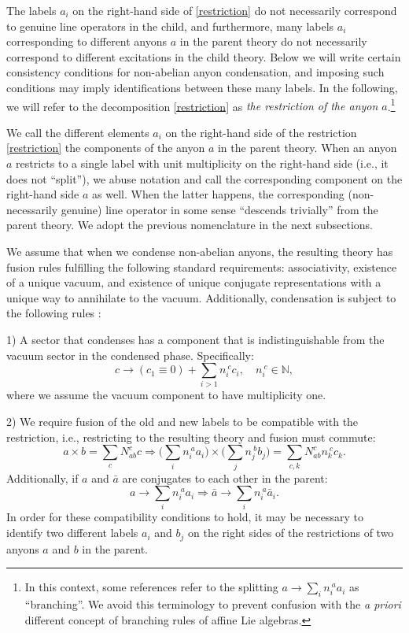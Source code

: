 \documentclass[11pt]{article}
\numberwithin{equation}{section}
\begin{document}
The labels $a_{i}$ on the right-hand side of \eqref{restriction} do not necessarily correspond to genuine line operators in the child, and furthermore, many labels $a_{i}$ corresponding to different anyons $a$ in the parent theory do not necessarily correspond to different excitations in the child theory. Below we will write certain consistency conditions for non-abelian anyon condensation, and imposing such conditions may imply identifications between these many labels. In the following, we will refer to the decomposition \eqref{restriction} as \textit{the restriction of the anyon $a$}.\footnote{In this context, some references refer to the splitting $a \to \sum_{i} n_{i}^{\ a} a_{i}$ as ``branching''. We avoid this terminology to prevent confusion with the \textit{a priori} different concept of branching rules of affine Lie algebras.} 

We call the different elements $a_{i}$ on the right-hand side of the restriction \eqref{restriction} the components of the anyon $a$ in the parent theory. When an anyon $a$ restricts to a single label with unit multiplicity on the right-hand side (i.e., it does not ``split''), we abuse notation and call the corresponding component on the right-hand side $a$ as well. When the latter happens, the corresponding (non-necessarily genuine) line operator in some sense ``descends trivially'' from the parent theory. We adopt the previous nomenclature in the next subsections.

We assume that when we condense non-abelian anyons, the resulting theory has fusion rules fulfilling the following standard requirements: associativity, existence of a unique vacuum, and existence of unique conjugate representations with a unique way to annihilate to the vacuum.  Additionally, condensation is subject to the following rules \cite{Bais:2008ni}: 

1) A sector that condenses has a component that is indistinguishable from the vacuum sector in the condensed phase. Specifically:
\begin{equation}
    c \longrightarrow (c_{1} \equiv 0) + \sum_{i>1}n_{i}^{\ c}c_{i}, \quad n_{i}^{\ c} \in \mathbb{N},
\end{equation}
where we assume the vacuum component to have multiplicity one. 

2) We require fusion of the old and new labels to be compatible with the restriction, i.e., restricting to the resulting theory and fusion must commute:
\begin{equation}
    a \times b = \sum_{c} N_{ab}^{c} c \Longrightarrow \Big( \sum_{i}n_{i}^{\ a}a_{i} \Big) \times \Big( \sum_{j}n_{j}^{\ b}b_{j} \Big) = \sum_{c,k}N_{ab}^{c}n_{k}^{\ c}c_{k}.
\end{equation}
Additionally, if $a$ and $\bar{a}$ are conjugates to each other in the parent:
\begin{equation}
    a \longrightarrow \sum_{i} n_{i}^{\ a}a_{i} \Longrightarrow \bar{a} \longrightarrow \sum_{i}n_{i}^{\ a}\bar{a}_{i}.
\end{equation}
In order for these compatibility conditions to hold, it may be necessary to identify two different labels $a_{i}$ and $b_{j}$ on the right sides of the restrictions of two anyons $a$ and $b$ in the parent. 
\end{document}
